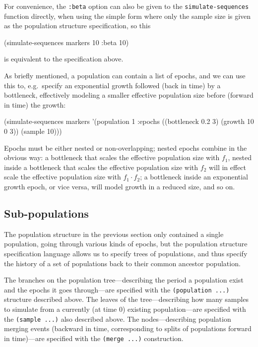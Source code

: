 \documentclass{manual}
\begin{document}
\begin{empfile}
For convenience, the \texttt{:beta} option can also be given to the
\texttt{simulate-sequences} function directly, when using the simple
form where only the sample size is given as the population structure
specification, so this
\begin{code}
(simulate-sequences markers 10 :beta 10)
\end{code}
is equivalent to the specification above.

As briefly mentioned, a population can contain a list of epochs, and
we can use this to, e.g.\ specify an exponential growth followed (back
in time) by a bottleneck, effectively modeling a smaller effective
population size before (forward in time) the growth:
\begin{code}
(simulate-sequences markers
   '(population 1 :epochs ((bottleneck 0.2 3) (growth 10 0 3))
                (sample 10)))
\end{code}

Epochs must be either nested or non-overlapping; nested epochs combine
in the obvious way: a bottleneck that scales the effective population
size with $f_1$, nested inside a bottleneck that scales the effective
population size with $f_2$ will in effect scale the effective
population size with $f_1\cdot{}f_2$; a bottleneck inside an
exponential growth epoch, or vice versa, will model growth in a
reduced size, and so on.



\subsection{Sub-populations}
\label{sec:sub-pop}

The population structure in the previous section only contained a
single population, going through various kinds of epochs, but the
population structure specification language allows us to specify trees
of populations, and thus specify the history of a set of populations
back to their common ancestor population.

The branches on the population tree---describing the period a
population exist and the epochs it goes through---are specified with
the \texttt{(population ...)} structure described above.  The leaves
of the tree---describing how many samples to simulate from a currently
(at time 0) existing population---are specified with the
\texttt{(sample ...)} also described above.  The nodes---describing
population merging events (backward in time, corresponding to splits
of populations forward in time)---are specified with the
\texttt{(merge ...)} construction.


\end{empfile}
\end{document}
